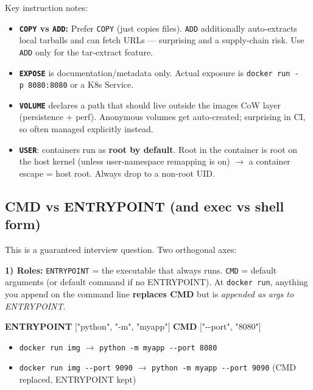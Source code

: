 \documentclass[11pt]{article}
\providecommand{\tightlist}{\setlength{\itemsep}{1pt}\setlength{\parskip}{0pt}}
\newenvironment{Shaded}{\begin{snugshade}}{\end{snugshade}}
\newcommand{\KeywordTok}[1]{\textcolor[rgb]{0.81,0.81,0.76}{\textbf{#1}}}
\newcommand{\NormalTok}[1]{\textcolor[rgb]{0.81,0.81,0.76}{#1}}
\newcommand{\StringTok}[1]{\textcolor[rgb]{0.96,0.31,0.31}{#1}}
\begin{document}
Key instruction notes:

\begin{itemize}
\tightlist
\item
  \textbf{\texttt{COPY} vs \texttt{ADD}:} Prefer \texttt{COPY} (just copies files). \texttt{ADD} additionally auto-extracts local tarballs and can fetch URLs --- surprising and a supply-chain risk. Use \texttt{ADD} only for the tar-extract feature.
\item
  \textbf{\texttt{EXPOSE}} is documentation/metadata only. Actual exposure is \texttt{docker\ run\ -p\ 8080:8080} or a K8s Service.
\item
  \textbf{\texttt{VOLUME}} declares a path that should live outside the image\textquotesingle s CoW layer (persistence + perf). Anonymous volumes get auto-created; surprising in CI, so often managed explicitly instead.
\item
  \textbf{\texttt{USER}}: containers run as \textbf{root by default}. Root in the container is root on the host kernel (unless user-namespace remapping is on) \(\rightarrow\) a container escape = host root. Always drop to a non-root UID.
\end{itemize}

\subsection{CMD vs ENTRYPOINT (and exec vs shell form)}\label{cmd-vs-entrypoint-and-exec-vs-shell-form}

This is a guaranteed interview question. Two orthogonal axes:

\textbf{1) Roles:} \texttt{ENTRYPOINT} = the executable that always runs. \texttt{CMD} = default arguments (or default command if no ENTRYPOINT). At \texttt{docker\ run}, anything you append on the command line \textbf{replaces CMD} but is \emph{appended as args to ENTRYPOINT}.


\begin{Shaded}
\begin{Highlighting}[]
\KeywordTok{ENTRYPOINT}\NormalTok{ [}\StringTok{"python"}\NormalTok{, }\StringTok{"{-}m"}\NormalTok{, }\StringTok{"myapp"}\NormalTok{]}
\KeywordTok{CMD}\NormalTok{ [}\StringTok{"{-}{-}port"}\NormalTok{, }\StringTok{"8080"}\NormalTok{]}
\end{Highlighting}
\end{Shaded}

\begin{itemize}
\tightlist
\item
  \texttt{docker\ run\ img} \(\rightarrow\) \texttt{python\ -m\ myapp\ -\/-port\ 8080}
\item
  \texttt{docker\ run\ img\ -\/-port\ 9090} \(\rightarrow\) \texttt{python\ -m\ myapp\ -\/-port\ 9090} (CMD replaced, ENTRYPOINT kept)
\end{itemize}
\end{document}

